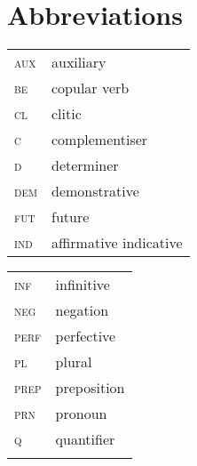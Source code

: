 \documentclass[output=paper]{langsci/langscibook}
\begin{document}
\section*{\textbf{Abbreviations}}

\begin{tabularx}{.45\textwidth}{lX}
\textsc{aux} & auxiliary\\

\textsc{be} & copular verb\\

\textsc{cl} & clitic\\

\textsc{c} & complementiser\\

\textsc{d} & determiner\\

\textsc{dem} & demonstrative\\

\textsc{fut} & future\\
 
\textsc{ind}  &  affirmative indicative \\
\end{tabularx}
\begin{tabularx}{.45\textwidth}{lX}
\textsc{inf} & infinitive\\

\textsc{neg} & negation\\

\textsc{perf} & perfective\\

\textsc{pl} & plural\\

\textsc{prep} & preposition\\

\textsc{prn} & pronoun\\

\textsc{q} & quantifier\\
\\
\end{tabularx}

\printbibliography[heading=subbibliography,notkeyword=this]
\end{document}
